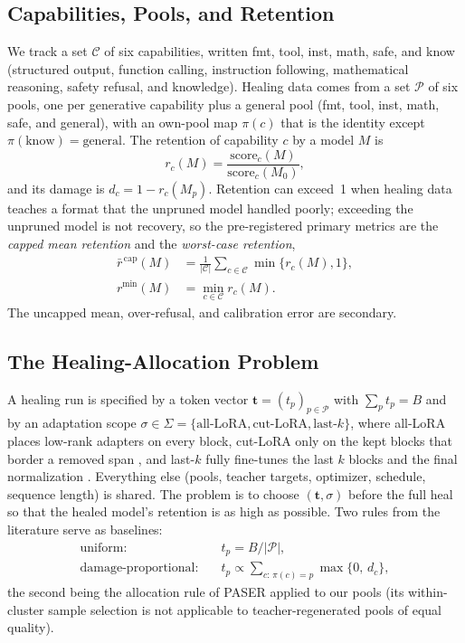 \documentclass{ieeeaccess}
\newcommand{\Mz}{M_{0}}
\newcommand{\Mp}{M_{p}}
\newcommand{\caps}{\mathcal{C}}
\newcommand{\pools}{\mathcal{P}}
\newcommand{\own}{\pi}
\newcommand{\tvec}{\mathbf{t}}
\begin{document}
\subsection{Capabilities, Pools, and Retention}
We track a set $\caps$ of six capabilities, written fmt, tool, inst, math, safe, and know (structured output, function calling, instruction following, mathematical reasoning, safety refusal, and knowledge). Healing data comes from a set $\pools$ of six pools, one per generative capability plus a general pool (fmt, tool, inst, math, safe, and general), with an own-pool map $\own(c)$ that is the identity except $\own(\text{know}) = \text{general}$. The retention of capability $c$ by a model $M$ is
\begin{equation}
r_c(M) = \frac{\mathrm{score}_c(M)}{\mathrm{score}_c(\Mz)},
\label{eq:retention}
\end{equation}
and its damage is $d_c = 1 - r_c(\Mp)$. Retention can exceed~1 when healing data teaches a format that the unpruned model handled poorly; exceeding the unpruned model is not recovery, so the pre-registered primary metrics are the \emph{capped mean retention} and the \emph{worst-case retention},
\begin{align}
\bar r^{\,\mathrm{cap}}(M) &= \frac{1}{|\caps|}\sum_{c\in\caps}\min\{r_c(M),1\}, \label{eq:metrics}\\
r^{\min}(M) &= \min_{c\in\caps} r_c(M). \label{eq:worst}
\end{align}
The uncapped mean, over-refusal, and calibration error are secondary.

\subsection{The Healing-Allocation Problem}
A healing run is specified by a token vector $\tvec = (t_p)_{p\in\pools}$ with $\sum_p t_p = B$ and by an adaptation scope $\sigma \in \Sigma = \{\text{all-LoRA},\text{cut-LoRA},\text{last-}k\}$, where all-LoRA places low-rank adapters \cite{hu2022lora} on every block, cut-LoRA only on the kept blocks that border a removed span \cite{clp2025}, and last-$k$ fully fine-tunes the last $k$ blocks and the final normalization \cite{lu2024reassessing}. Everything else (pools, teacher targets, optimizer, schedule, sequence length) is shared. The problem is to choose $(\tvec,\sigma)$ before the full heal so that the healed model's retention is as high as possible. Two rules from the literature serve as baselines:
\begin{align}
\text{uniform:}\quad & t_p = B/|\pools|, \label{eq:uniform}\\
\text{damage-proportional:}\quad & t_p \propto \sum_{c:\,\own(c)=p}\max\{0,\,d_c\}, \label{eq:dprop}
\end{align}
the second being the allocation rule of PASER \cite{he2026paser} applied to our pools (its within-cluster sample selection is not applicable to teacher-regenerated pools of equal quality).
\end{document}
